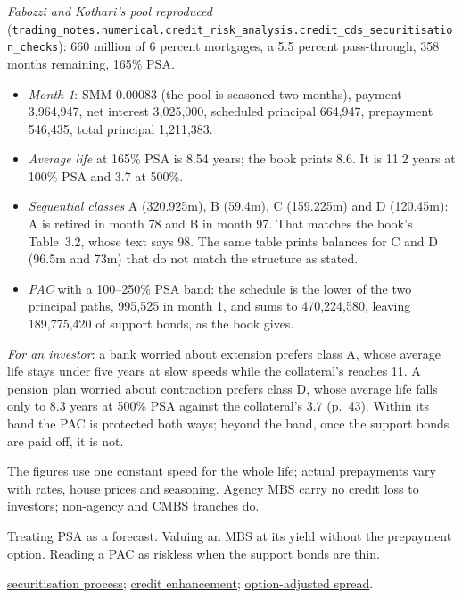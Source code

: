 \begin{qfmethod}
 \emph{Fabozzi and Kothari's pool reproduced} (\nolinkurl{trading_notes.numerical.credit_risk_analysis.credit_cds_securitisation_checks}): 660 million of 6 percent mortgages, a 5.5 percent pass-through, 358 months remaining, 165\% PSA.
\begin{itemize}
\item \emph{Month 1}: SMM 0.00083 (the pool is seasoned two months), payment 3,964,947, net interest 3,025,000, scheduled principal 664,947, prepayment 546,435, total principal 1,211,383.
\item \emph{Average life} at 165\% PSA is 8.54 years; the book prints 8.6. It is 11.2 years at 100\% PSA and 3.7 at 500\%.
\item \emph{Sequential classes} A (320.925m), B (59.4m), C (159.225m) and D (120.45m): A is retired in month 78 and B in month 97. That matches the book's Table~3.2, whose text says 98. The same table prints balances for C and D (96.5m and 73m) that do not match the structure as stated.
\item \emph{PAC} with a 100--250\% PSA band: the schedule is the lower of the two principal paths, 995,525 in month 1, and sums to 470,224,580, leaving 189,775,420 of support bonds, as the book gives.
\end{itemize}
\emph{For an investor}: a bank worried about extension prefers class A, whose average life stays under five years at slow speeds while the collateral's reaches 11. A pension plan worried about contraction prefers class D, whose average life falls only to 8.3 years at 500\% PSA against the collateral's 3.7 (p.~43). Within its band the PAC is protected both ways; beyond the band, once the support bonds are paid off, it is not.

 The figures use one constant speed for the whole life; actual prepayments vary with rates, house prices and seasoning. Agency MBS carry no credit loss to investors; non-agency and CMBS tranches do.

 Treating PSA as a forecast. Valuing an MBS at its yield without the prepayment option. Reading a PAC as riskless when the support bonds are thin.

 \hyperref[def:securitisation-process]{securitisation process}; \hyperref[meth:abs-structures-credit-enhancement]{credit enhancement}; \hyperref[meth:option-adjusted-spread]{option-adjusted spread}.

\end{qfmethod}

